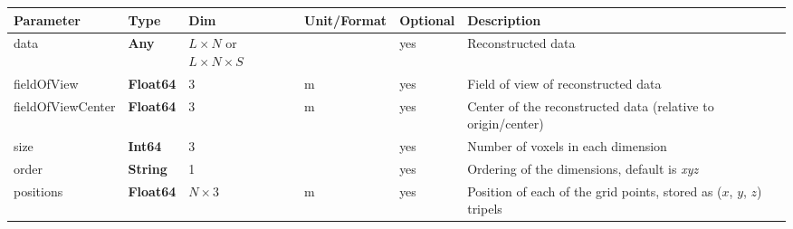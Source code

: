 \documentclass[landscape]{article} %
\newcommand{\inltab}[1]{{\ttfamily\bfseries\color{blue}#1}}
\newcommand{\inlvar}[1]{{\ttfamily#1}}
\begin{document}
\noindent \begin{tabularx}{\columnwidth}{lllllX} 
\textbf{Parameter} & \textbf{Type} & \textbf{Dim} & \textbf{Unit/Format} & \textbf{Optional} & \textbf{Description} \\ \hline 
\inlvar{data} & \inltab{Any} & $L\times N$ or $L\times N \times S$ & & yes & Reconstructed data \\ \hline
\inlvar{fieldOfView} & \inltab{Float64} & $3$ & m & yes & Field of view of reconstructed data \\ \hline
\inlvar{fieldOfViewCenter} & \inltab{Float64} & $3$ & m & yes & Center of the reconstructed data (relative to origin/center) \\ \hline 
\inlvar{size} & \inltab{Int64} & $3$ &  & yes & Number of voxels in each dimension \\ \hline
\inlvar{order} & \inltab{String} & 1 & & yes & Ordering of the dimensions, default is \textit{xyz} \\ \hline
\inlvar{positions} & \inltab{Float64} & $N \times 3$ & m & yes & Position of each of the grid points, stored as ($x$, $y$, $z$) tripels \\ \hline
\end{tabularx}



\end{document}
